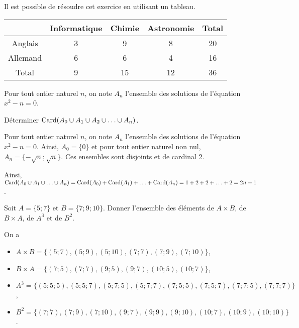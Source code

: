 \documentclass[11pt,fleqn, openany]{book} %
\begin{document}
\begin{solution}Il est possible de résoudre cet exercice en utilisant un tableau.

\begin{center}
\begin{tabular}{|c|c|c|c|c|}
\hline
 & Informatique & Chimie & Astronomie & Total \\
 \hline
 Anglais &3&9&8&20 \\
 \hline
 Allemand &6&6&4&16\\
 \hline
 Total &9&15&12&36 \\
 \hline \end{tabular}
\end{center}\end{solution}




\begin{exercise}Pour tout entier naturel $n$, on note $A_n$ l'ensemble des solutions de l'équation $x^2-n=0$. 

Déterminer $\mathrm{Card}(A_0 \cup A_1 \cup A_2 \cup \ldots \cup A_n)$.	
\end{exercise}

\begin{solution}Pour tout entier naturel $n$, on note $A_n$ l'ensemble des solutions de l'équation $x^2-n=0$. Ainsi, $A_0=\{0\}$ et pour tout entier naturel non nul, $A_n=\{-\sqrt{n} ; \sqrt{n}\}$. Ces ensembles sont disjoints et de cardinal 2.

Ainsi, $\mathrm{Card}(A_0 \cup A_1  \cup \ldots \cup A_n)=\mathrm{Card}(A_0)+\mathrm{Card}(A_1)+\ldots + \mathrm{Card}(A_n)=1+2+2+\ldots + 2=2n+1$.\end{solution}





\begin{exercise}Soit $A=\{5;7\}$ et $B=\{7;9;10\}$. Donner l'ensemble des éléments de $A\times B$, de $B \times A$, de $A^3$ et de $B^2$.\end{exercise}

\begin{solution} On a
\begin{itemize}
\item $A\times B=\{(5;7), (5;9), (5;10), (7;7), (7;9), (7;10)\}$, 
\item $B \times A = \{(7;5),(7;7), (9;5), (9;7), (10;5), (10;7)\}$, 
\item $A^3 = \{(5;5;5),(5;5;7),(5;7;5), (5;7;7), (7;5;5),(7;5;7),(7;7;5),(7;7;7)\}$,
\item $B^2=\{(7;7),(7;9),(7;10),(9;7),(9;9),(9;10),(10;7),(10;9),(10;10)\}$.
\end{itemize}\end{solution}
\end{document}
